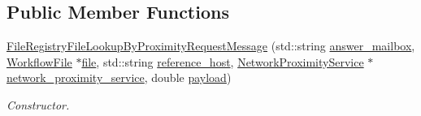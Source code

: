 \subsection*{Public Member Functions}
\begin{DoxyCompactItemize}
\item 
\hyperlink{classwrench_1_1_file_registry_file_lookup_by_proximity_request_message_afbfff2b7190bad627e860907f18c5851}{File\+Registry\+File\+Lookup\+By\+Proximity\+Request\+Message} (std\+::string \hyperlink{classwrench_1_1_file_registry_file_lookup_by_proximity_request_message_a357c9ad71225afa3aaa7c22b046c8c46}{answer\+\_\+mailbox}, \hyperlink{classwrench_1_1_workflow_file}{Workflow\+File} $\ast$\hyperlink{classwrench_1_1_file_registry_file_lookup_by_proximity_request_message_a63f1293e162d85c299604601ba033339}{file}, std\+::string \hyperlink{classwrench_1_1_file_registry_file_lookup_by_proximity_request_message_add8ecc8a1fb81d2a6047ee4b57b415b7}{reference\+\_\+host}, \hyperlink{classwrench_1_1_network_proximity_service}{Network\+Proximity\+Service} $\ast$\hyperlink{classwrench_1_1_file_registry_file_lookup_by_proximity_request_message_ad4bdba9262cee51b18a04852476218b9}{network\+\_\+proximity\+\_\+service}, double \hyperlink{classwrench_1_1_simulation_message_a914f2732713f7c02898e66f05a7cb8a1}{payload})
\begin{DoxyCompactList}\small\item\em Constructor. \end{DoxyCompactList}\end{DoxyCompactItemize}
